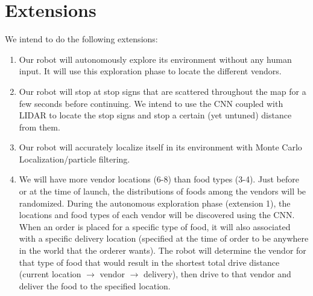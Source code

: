 \documentclass{article}
\begin{document}
\section*{Extensions}
We intend to do the following extensions:
\begin{enumerate}
    \item Our robot will autonomously explore its environment without any human input. It will use this exploration phase to locate the different vendors.
    \item Our robot will stop at stop signs that are scattered throughout the map for a few seconds before continuing. We intend to use the CNN coupled with LIDAR to locate the stop signs and stop a certain (yet untuned) distance from them. 
    \item Our robot will accurately localize itself in its environment with Monte Carlo Localization/particle filtering. 
    \item We will have more vendor locations (6-8) than food types (3-4). Just before or at the time of launch, the distributions of foods among the vendors will be randomized. During the autonomous exploration phase (extension 1), the locations and food types of each vendor will be discovered using the CNN. When an order is placed for a specific type of food, it will also associated with a specific delivery location (specified at the time of order to be anywhere in the world that the orderer wants). The robot will determine the vendor for that type of food that would result in the shortest total drive distance (current location $\xrightarrow{}$ vendor $\xrightarrow{}$ delivery), then drive to that vendor and deliver the food to the specified location.
    
    
    
\end{enumerate}
\end{document}
